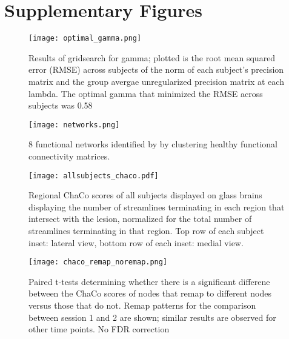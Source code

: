 \documentclass[10pt]{article}
\begin{document}
\section*{Supplementary Figures}
\begin{figure}[h] %
	\begin{center}
		\texttt{[image: optimal\_gamma.png]}
		\caption{Results of gridsearch for gamma; plotted is the root mean squared error (RMSE) across subjects of the norm of each subject's precision matrix and the group avergae unregularized precision matrix at each lambda. The optimal gamma that minimized the RMSE across subjects was 0.58}
		\centering
		\label{precision}
	\end{center}
\end{figure}

\begin{figure}[h] %
	\begin{center}
	\texttt{[image: networks.png]}
	\caption{8 functional networks identified by \cite{Finn2015-er} by clustering healthy functional connectivity matrices.}
	\centering	
	\label{networks}
	\end{center}
\end{figure}

\begin{figure}[h] %
		\texttt{[image: allsubjects\_chaco.pdf]}
		\caption{Regional ChaCo scores of all subjects displayed on glass brains displaying the number of streamlines terminating in each region that intersect with the lesion, normalized for the total number of streamlines terminating in that region. Top row of each subject inset: lateral view, bottom row of each inset: medial view.}
		\label{chacoscores}
		\centering
\end{figure}

\begin{figure}[h] %
	\texttt{[image: chaco\_remap\_noremap.png]}
	\caption{Paired t-tests determining whether there is a significant differene between the ChaCo scores of nodes that remap to different nodes versus those that do not. Remap patterns for the comparison between session 1 and 2 are shown; similar results are observed for other time points. No FDR correction}	\centering
	\label{chaco_remap_noremap}
\end{figure}
	
\end{document}
